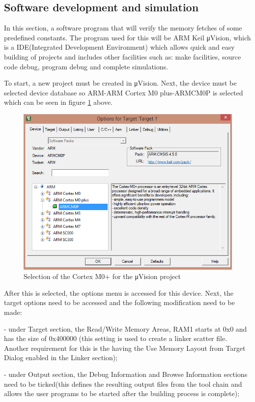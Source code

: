 \subsection{Software development and simulation}
In this section, a software program that will verify the memory fetches of some predefined constants. The program used for this will be ARM Keil μVision, which is a IDE(Integrated Development Environment) which allows quick and easy building of projects and includes other facilities such as: make facilities, source code debug, program debug and complete simulations.

To start, a new project must be created in μVision. Next, the device must be selected device database so ARM-ARM Cortex M0 plus-ARMCM0P is selected which can be seen in figure \ref{fig:armcm0p} above.
\begin{figure}
\centering
\includegraphics[scale=0.7]{figures/armcm0p.PNG}
\caption{Selection of the Cortex M0+ for the μVision project} 
\label{fig:armcm0p}
\end{figure}

After this is selected, the options menu is accessed for this device. Next, the target options need to be accessed and the following modification need to be made:

- under Target section, the Read/Write Memory Areas, RAM1 starts at 0x0 and has the size of 0x400000 (this setting is used to create a linker scatter file. Another requirement for this is the having the Use Memory Layout from Target Dialog enabled in the Linker section);

- under Output section, the Debug Information and Browse Information sections need to be ticked(this defines the resulting output files from the tool chain and allows the user programs to be started after the building process is complete);

